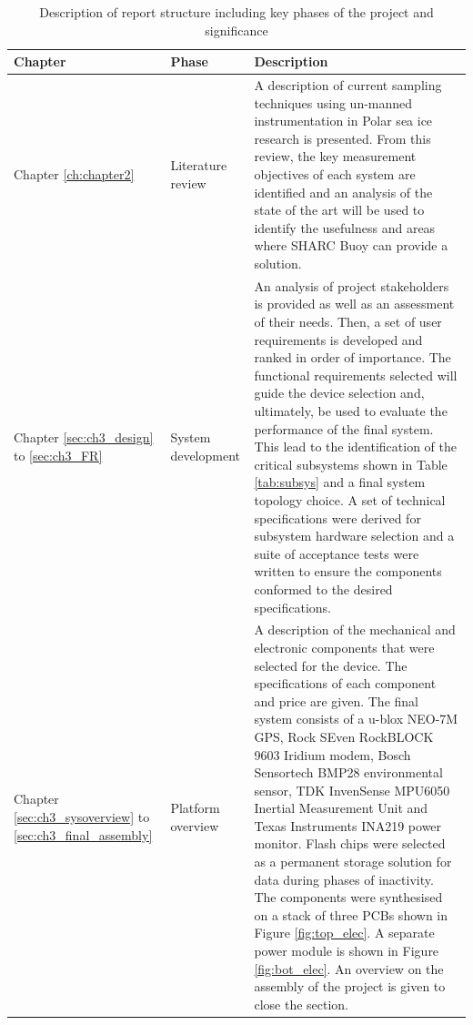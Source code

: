 \begin{center}
   {\setlength{\extrarowheight}{5pt}%
   	\footnotesize
    \begin{longtable}[H]{>{\centering}m{} >{\centering}m{}  
   m{}}
        \caption{Description of report structure including key phases of the project and
        significance}
        \label{tab:report_structure}\\
        \hline
        \textbf{Chapter} & \textbf{Phase} & \textbf{Description} \\
        \hline
        \hline
        Chapter \ref{ch:chapter2} & Literature review & A description of current sampling techniques using un-manned instrumentation in Polar sea ice research is presented. From this review, the key measurement objectives of each system are identified and an analysis of the state of the art will be used to identify the usefulness and areas where SHARC Buoy can provide a solution. \\
        \hline
        Chapter \ref{sec:ch3_design} to \ref{sec:ch3_FR} & System development &  An analysis of project stakeholders is provided as well as an assessment of their needs. Then, a set of user requirements is developed and ranked in order of importance. The functional requirements selected will guide the device selection and, ultimately, be used to evaluate the performance of the final system. This lead to the identification of the critical subsystems shown in Table \ref{tab:subsys} and a final system topology choice. A set of technical specifications were derived for subsystem hardware selection and a suite of acceptance tests were written to ensure the components conformed to the desired specifications.\\
        \hline
        Chapter \ref{sec:ch3_sysoverview} to \ref{sec:ch3_final_assembly} & Platform overview & A description of the mechanical and electronic components that were selected for the device. The specifications of each component and price are given. The final system consists of a u-blox NEO-7M GPS, Rock SEven RockBLOCK 9603 Iridium modem, Bosch Sensortech BMP28  environmental sensor, TDK InvenSense MPU6050 Inertial Measurement Unit and Texas Instruments INA219 power monitor. Flash chips were selected as a permanent storage solution for data during phases of inactivity. The components were synthesised on a stack of three PCBs shown in Figure \ref{fig:top_elec}. A separate power module is shown in Figure \ref{fig:bot_elec}. An overview on the assembly of the project is given to close the section.\\

\end{longtable}}
\end{center}
